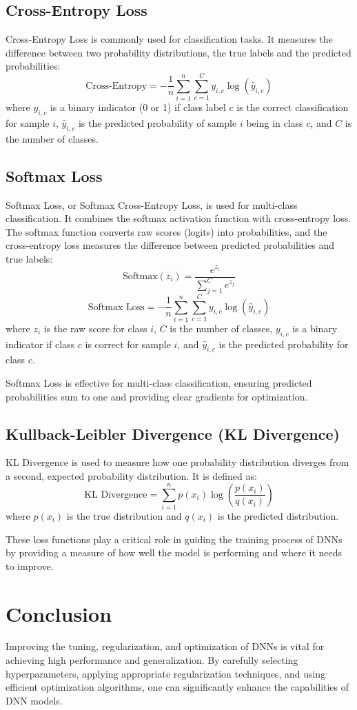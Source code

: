 \documentclass[12pt]{article}
\begin{document}
\subsection{Cross-Entropy Loss}
Cross-Entropy Loss is commonly used for classification tasks. It measures the difference between two probability distributions, the true labels and the predicted probabilities:
\[
\text{Cross-Entropy} = -\frac{1}{n} \sum_{i=1}^{n} \sum_{c=1}^{C} y_{i,c} \log(\hat{y}_{i,c})
\]
where \( y_{i,c} \) is a binary indicator (0 or 1) if class label \( c \) is the correct classification for sample \( i \), \( \hat{y}_{i,c} \) is the predicted probability of sample \( i \) being in class \( c \), and \( C \) is the number of classes.

\subsection{Softmax Loss}
Softmax Loss, or Softmax Cross-Entropy Loss, is used for multi-class classification. It combines the softmax activation function with cross-entropy loss. The softmax function converts raw scores (logits) into probabilities, and the cross-entropy loss measures the difference between predicted probabilities and true labels:
\[
\text{Softmax}(z_i) = \frac{e^{z_i}}{\sum_{j=1}^{C} e^{z_j}}
\]
\[
\text{Softmax Loss} = -\frac{1}{n} \sum_{i=1}^{n} \sum_{c=1}^{C} y_{i,c} \log(\hat{y}_{i,c})
\]
where \( z_i \) is the raw score for class \( i \), \( C \) is the number of classes, \( y_{i,c} \) is a binary indicator if class \( c \) is correct for sample \( i \), and \( \hat{y}_{i,c} \) is the predicted probability for class \( c \).

Softmax Loss is effective for multi-class classification, ensuring predicted probabilities sum to one and providing clear gradients for optimization.

\subsection{Kullback-Leibler Divergence (KL Divergence)}
KL Divergence is used to measure how one probability distribution diverges from a second, expected probability distribution. It is defined as:
\[
\text{KL Divergence} = \sum_{i=1}^{n} p(x_i) \log \left( \frac{p(x_i)}{q(x_i)} \right)
\]
where \( p(x_i) \) is the true distribution and \( q(x_i) \) is the predicted distribution.

These loss functions play a critical role in guiding the training process of DNNs by providing a measure of how well the model is performing and where it needs to improve.

\section{Conclusion}
Improving the tuning, regularization, and optimization of DNNs is vital for achieving high performance and generalization. By carefully selecting hyperparameters, applying appropriate regularization techniques, and using efficient optimization algorithms, one can significantly enhance the capabilities of DNN models.
\end{document}
